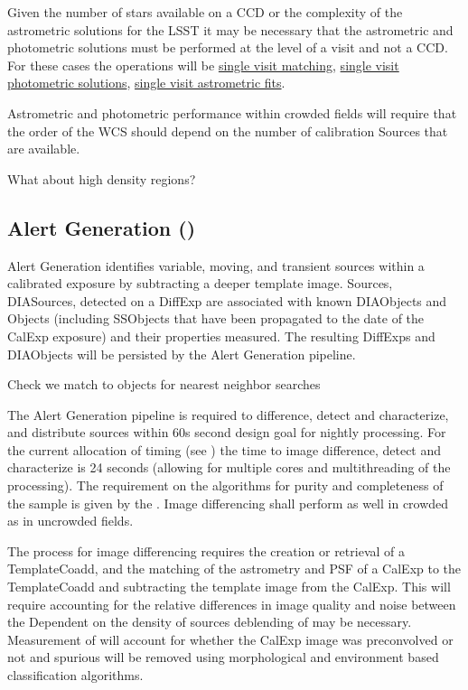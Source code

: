 Given the number of stars available on a CCD or the complexity of the astrometric solutions for the LSST it may be necessary that the astrometric and photometric solutions must be performed at the level of a visit and not a CCD.  For these cases the operations will be \hyperref[sec:acSingleVisitReferenceMatching]{single visit matching},   \hyperref[sec:acSingleCCDPhotometricFit]{single visit photometric solutions}, \hyperref[sec:acSingleVisitAstrometricFit]{single visit astrometric fits}.

Astrometric and photometric performance within crowded fields will require that the order of the WCS should depend on the number of calibration Sources that are available.

\begin{note} What about high density regions? \end{note}

\subsection{Alert Generation (\wbsDiffim)}
\label{sec:apAlertGeneration}

Alert Generation identifies variable, moving, and transient sources within a calibrated exposure by subtracting a deeper template image. Sources, DIASources, detected on a DiffExp are associated with known DIAObjects and Objects (including SSObjects that have been propagated to the date of the CalExp exposure) and their properties measured. The resulting DiffExps and DIAObjects will be persisted by the Alert Generation pipeline.
\begin{note} Check we match to objects for nearest neighbor searches \end{note}

The Alert Generation pipeline is required to difference, detect and characterize, and distribute sources within 60s second design goal for nightly processing. For the current allocation of timing (see \hyperref[]{}) the time to image difference, detect and characterize  \DIASources is 24 seconds (allowing for multiple cores and multithreading of the processing). The requirement on the algorithms for purity and completeness of the sample is given by the \DMSR\@. Image differencing shall perform as well in crowded as in uncrowded fields. 

The process for image differencing requires the creation or retrieval of a TemplateCoadd, and the matching of the  astrometry and PSF of a CalExp to the TemplateCoadd and subtracting the template image from the CalExp. This will require accounting for the relative differences in image quality and noise between the Dependent on the density of sources deblending of \DIASources may be necessary. Measurement of \DIASources will account for whether the CalExp image was preconvolved or not and spurious \DIASources will be removed using morphological and environment based classification algorithms. 

